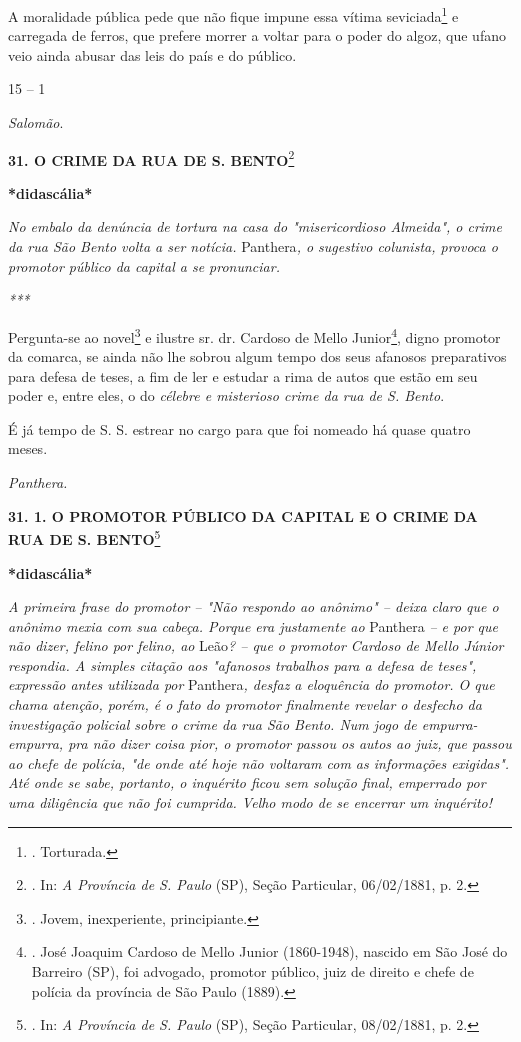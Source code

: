 A moralidade pública pede que não fique impune essa vítima
seviciada\footnote{. Torturada.}
e carregada de ferros, que
prefere morrer a voltar para o poder do algoz, que ufano veio ainda
abusar das leis do país e do público.

15 -- 1

\emph{Salomão}.

\textbf{31. O CRIME DA RUA DE S. BENTO}\footnote{. In: \emph{A Província
  de S. Paulo} (SP), Seção Particular, 06/02/1881, p. 2.}

\textbf{*didascália*}

\emph{No embalo da denúncia de tortura na casa do "misericordioso
Almeida", o crime da rua São Bento volta a ser notícia.} Panthera\emph{,
o sugestivo colunista, provoca o promotor público da capital a se
pronunciar. }

\emph{***}

Pergunta-se ao novel\footnote{. Jovem, inexperiente, principiante.} e
ilustre sr. dr. Cardoso de Mello Junior\footnote{. José Joaquim Cardoso
  de Mello Junior (1860-1948), nascido em São José do Barreiro (SP), foi
  advogado, promotor público, juiz de direito e chefe de polícia da
  província de São Paulo (1889).},
digno promotor da comarca,
se ainda não lhe sobrou algum tempo dos seus afanosos preparativos para
defesa de teses, a fim de ler e estudar a rima de autos que estão em seu
poder e, entre eles, o do \emph{célebre e misterioso crime da rua de S.
Bento}.

É já tempo de S. S. estrear no cargo para que foi nomeado há quase
quatro meses.

\emph{Panthera.}

\textbf{31. 1. O PROMOTOR
PÚBLICO DA CAPITAL E O CRIME DA RUA DE S. BENTO}\footnote{. In: \emph{A
  Província de S. Paulo} (SP), Seção Particular, 08/02/1881, p. 2.}

\textbf{*didascália*}

\emph{A primeira frase do promotor -- "Não respondo ao anônimo" -- deixa
claro que o anônimo mexia com sua cabeça. Porque era justamente ao}
Panthera \emph{-- e por que não dizer, felino por felino, ao}
Leão\emph{? -- que o promotor Cardoso de Mello Júnior respondia. A
simples citação aos "afanosos trabalhos para a defesa de teses",
expressão antes utilizada por} Panthera\emph{, desfaz a eloquência do
promotor. O que chama atenção, porém, é o fato do promotor finalmente
revelar o desfecho da investigação policial sobre o crime da rua São
Bento. Num jogo de empurra-empurra, pra não dizer coisa pior, o promotor
passou os autos ao juiz, que passou ao chefe de polícia, "de onde até
hoje não voltaram com as informações exigidas". Até onde se sabe,
portanto, o inquérito ficou sem solução final, emperrado por uma
diligência que não foi cumprida. Velho modo de se encerrar um
inquérito!}

